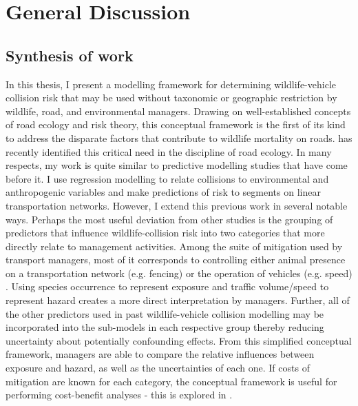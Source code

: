 \chapter{General Discussion}\label{sec:conc}
\newpage

\section{Synthesis of work}

In this thesis, I present a modelling framework for determining wildlife-vehicle collision risk that may be used without taxonomic or geographic restriction by wildlife, road, and environmental managers. Drawing on well-established concepts of road ecology and risk theory, this conceptual framework is the first of its kind to address the disparate factors that contribute to wildlife mortality on roads. \cite{clev15} has recently identified this critical need in the discipline of road ecology. In many respects, my work is quite similar to predictive modelling studies that have come before it. I use regression modelling to relate collisions to environmental and anthropogenic variables and make predictions of risk to segments on linear transportation networks. However, I extend this previous work in several notable ways. Perhaps the most useful deviation from other studies is the grouping of predictors that influence wildlife-collision risk into two categories that more directly relate to management activities. Among the suite of mitigation used by transport managers, most of it corresponds to controlling either animal presence on a transportation network (e.g. fencing) or the operation of vehicles (e.g. speed) \citep{}.  Using species occurrence to represent exposure and traffic volume/speed to represent hazard creates a more direct interpretation by managers. Further, all of the other predictors used in past wildlife-vehicle collision modelling may be incorporated into the sub-models in each respective group thereby reducing uncertainty about potentially confounding effects. From this simplified conceptual framework, managers are able to compare the relative influences between exposure and hazard, as well as the uncertainties of each one. If costs of mitigation are known for each category, the conceptual framework is useful for performing cost-benefit analyses - this is explored in .

